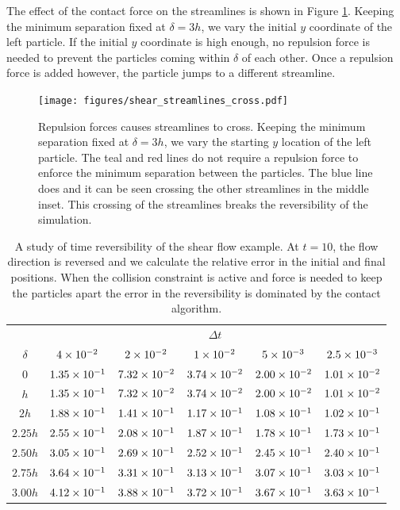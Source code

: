 \documentclass[preprint, 10pt]{elsarticle}
\begin{document}
The effect of the contact force on the streamlines is shown in Figure
\ref{fig:shear_cross}. Keeping the minimum separation fixed at $\delta = 3h$, we vary the initial
$y$ coordinate of the left particle. If the initial $y$ coordinate is high enough, no repulsion force is needed to prevent the particles coming within $\delta$ of each other. Once a repulsion force is added however, the particle jumps to a different streamline.

\begin{figure}[!h]
\begin{center}
\texttt{[image: figures/shear\_streamlines\_cross.pdf]}
\end{center}
\caption{Repulsion forces causes streamlines to cross. Keeping the minimum separation fixed at $\delta=3h$, we vary
the starting $y$ location of the left particle. The teal and red lines do not require a repulsion force to enforce the minimum separation between the particles. The blue line does and it can be seen crossing the other streamlines in the middle inset. This crossing of the streamlines breaks the reversibility of the simulation.}\label{fig:shear_cross}
\end{figure}

\begin{table}[!h]
\begin{center}
\begin{tabular}{c| c c c c c}
$ $ & & & $\Delta t$ & &\\
$\delta$ & $4\times 10^{-2}$ &$ 2\times 10^{-2}$ & $1\times 10^{-2}$ & $5\times 10^{-3}$ & $2.5\times 10^{-3}$\\
\hline
0 & $1.35\times 10^{-1}$ & $7.32\times 10^{-2}$ & $3.74\times 10^{-2}$ & $2.00\times 10^{-2}$ & $1.01\times 10^{-2}$\\
$h$ & $1.35\times 10^{-1}$ & $7.32\times 10^{-2}$ & $3.74\times 10^{-2}$ & $2.00\times 10^{-2}$ & $1.01\times 10^{-2}$\\
$2h$ & $1.88\times 10^{-1}$ & $1.41\times 10^{-1}$ & $1.17\times 10^{-1}$ & $1.08\times 10^{-1}$ &
$1.02\times 10^{-1}$\\
$2.25h$ & $2.55\times 10^{-1}$ & $2.08\times 10^{-1}$ & $1.87\times 10^{-1}$ & $1.78\times 10^{-1}$ &
$1.73\times 10^{-1}$\\
$2.50h$ & $3.05\times 10^{-1}$ & $2.69\times 10^{-1}$ & $2.52\times 10^{-1}$ & $2.45\times 10^{-1}$ &
$2.40\times 10^{-1}$\\
$2.75h$ & $3.64\times 10^{-1}$ & $3.31\times 10^{-1}$ & $3.13\times 10^{-1}$ & $3.07\times 10^{-1}$ &
$3.03\times 10^{-1}$\\
$3.00h$ & $4.12\times 10^{-1}$ & $3.88\times 10^{-1}$ & $3.72\times 10^{-1}$ & $3.67\times 10^{-1}$ &
$3.63\times 10^{-1}$
\end{tabular}
\end{center}
\caption{A study of time reversibility of the shear flow example. At $t=10$, the flow direction is reversed and we
calculate the relative error in the initial and final positions. When the collision constraint is active and force is needed to keep the
particles apart the error in the reversibility is dominated by the contact
algorithm.}\label{tab:reverse}
\end{table}
\end{document}
